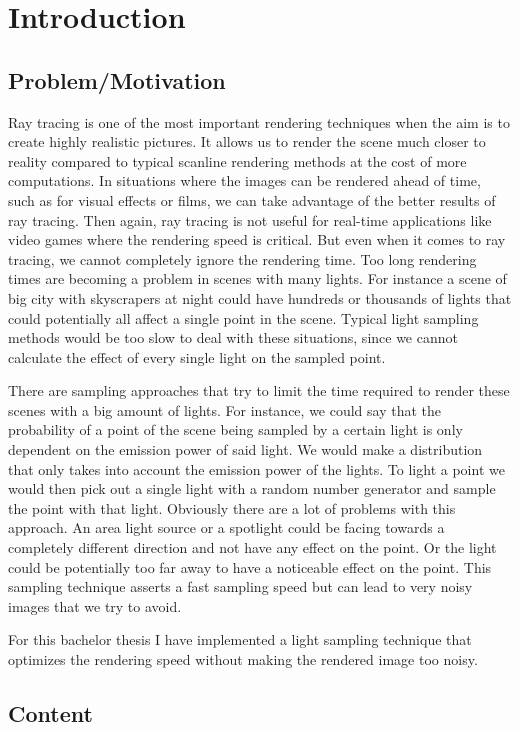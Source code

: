
\chapter{Introduction}
\label{ch:Introduction}

\section{Problem/Motivation}
\label{sec:Introduction:Motivation}

Ray tracing is one of the most important rendering techniques when the aim is to create highly realistic pictures. It allows us to render the scene much closer to reality compared to typical scanline rendering methods at the cost of more computations. In situations where the images can be rendered ahead of time, such as for visual effects or films, we can take advantage of the better results of ray tracing. Then again, ray tracing is not useful for real-time applications like video games where the rendering speed is critical. But even when it comes to ray tracing, we cannot completely ignore the rendering time. Too long rendering times are becoming a problem in scenes with many lights. For instance a scene of big city with skyscrapers at night could have hundreds or thousands of lights that could potentially all affect a single point in the scene. Typical light sampling methods would be too slow to deal with these situations, since we cannot calculate the effect of every single light on the sampled point.

There are sampling approaches that try to limit the time required to render these scenes with a big amount of lights. For instance, we could say that the probability of a point of the scene being sampled by a certain light is only dependent on the emission power of said light. We would make a distribution that only takes into account the emission power of the lights. To light a point we would then pick out a single light with a random number generator and sample the point with that light. Obviously there are a lot of problems with this approach. An area light source or a spotlight could be facing towards a completely different direction and not have any effect on the point. Or the light could be potentially too far away to have a noticeable effect on the point. This sampling technique asserts a fast sampling speed but can lead to very noisy images that we try to avoid.

For this bachelor thesis I have implemented a light sampling technique that optimizes the rendering speed without making the rendered image too noisy.

\section{Content}
\label{sec:Introduction:Content}